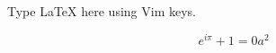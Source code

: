 \documentclass{article}
\begin{document}
Type LaTeX here using Vim keys.

\[
e^{i\pi} + 1 = 0
a^2
\]
\end{document}
